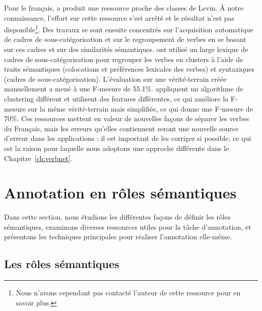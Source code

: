 Pour le français, \cite{saintdizier1996constructing} a produit une ressource
proche des classes de Levin. À notre connaissance, l'effort sur cette ressource
s'est arrêté et le résultat n'est pas disponible\footnote{Nous n'avons
cependant pas contacté l'auteur de cette ressource pour en savoir plus.}. Des
travaux se sont ensuite concentrés sur l'acquisition automatique de cadres de
sous-catégorisation et sur le regroupement de verbes en se basant sur ces
cadres et sur des similarités sémantiques. \cite{sun2010investigating} ont
utilisé un large lexique de cadres de sous-catégorisation
\citep{messiant2010acquisition} pour regrouper les verbes en clusters à l'aide
de traits sémantiques (colocations et préférences lexicales des verbes) et
syntaxiques (cadres de sous-catégorisation). L'évaluation sur une
vérité-terrain créée manuellement a mené à une F-mesure de 55.1\%.
\cite{falk2012classifying} appliquent un algorithme de clustering différent et
utilisent des features différentes, ce qui améliore la F-mesure sur la même
vérité-terrain mais simplifiée, ce qui donne une F-mesure de 70\%. Ces
ressources mettent en valeur de nouvelles façons de séparer les verbes du
Français, mais les erreurs qu'elles contiennent seront une nouvelle source
d'erreur dans les applications : il est important de les corriger si possible,
ce qui est la raison pour laquelle nous adoptons une approche différente dans
le Chapitre~\ref{ch:verbnet}.

\section{Annotation en rôles sémantiques}
\label{sec:srl}

Dans cette section, nous étudions les différentes façons de définir les rôles
sémantiques, examinons diverses ressources utiles pour la tâche d'annotation,
et présentons les techniques principales pour réaliser l'annotation elle-même.


\subsection{Les rôles sémantiques}
\label{subsec:roles_semantiques}


